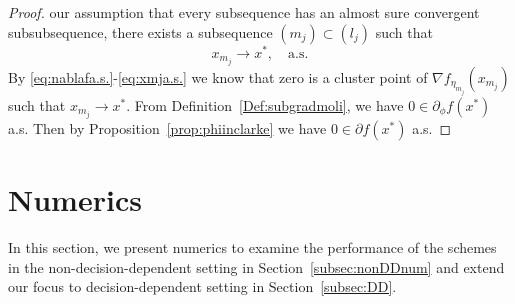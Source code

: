 \documentclass[11pt,reqno]{amsart}
\newcommand{\1}{{\bf 1}}
\newcommand{\2}{{\bf 2}}
\numberwithin{equation}{section}
\theoremstyle{remark}
\begin{document}
{\begin{proof}
				our assumption that every subsequence has an almost sure convergent subsubsequence, there exists a subsequence $(m_j)\subset(l_j)$ such that
				\begin{equation}\label{eq:xmja.s.}
					x_{m_j} \rightarrow x^*, \quad\text{a.s.}
				\end{equation}
				By \eqref{eq:nablafa.s.}-\eqref{eq:xmja.s.} we know that zero is a cluster point of $\nabla f_{\eta_{m_j}}(x_{m_j})$ such that $x_{m_j}\rightarrow x^{*}$. From Definition~\ref{Def:subgradmoli}, we have $	0 \in \partial_\phi f(x^*)$ a.s. Then by Proposition~\ref{prop:phiinclarke} we have $0 \in \partial f(x^*)$ a.s. 
				\end{proof}
				
				
				\section{Numerics}\label{sec:numerics}
				In this section, we {present numerics to examine the performance of the schemes in }  the non-decision-dependent setting in Section~\ref{subsec:nonDDnum} and extend our focus to decision-dependent setting in Section~\ref{subsec:DD}.
}
\end{document}
